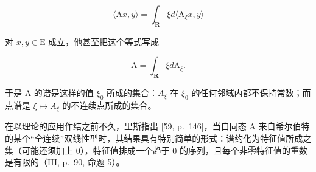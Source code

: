 \[
\langle \mathrm{A} x, y \rangle = \int_ {\mathbf {R}} \xi d \langle \mathrm{A} _ {\xi} x, y \rangle
\]

对 \(x, y \in \mathrm{E}\) 成立，他甚至把这个等式写成

\[
\mathrm{A} = \int_ {\mathbf {R}} \xi d \mathrm{A} _ {\xi}.
\]

于是 A 的谱是这样的值 \(\xi_{0}\) 所成的集合：\(A_{\xi}\) 在 \(\xi_{0}\) 的任何邻域内都不保持常数；而点谱是 \(\xi \mapsto A_{\xi}\) 的不连续点所成的集合。

在以理论的应用作结之前不久，里斯指出 [59, p.~146]，当自同态 A 来自希尔伯特的某个“全连续”双线性型时，其结果具有特别简单的形式：谱约化为特征值所成之集（可能还须加上 0），特征值排成一个趋于 0 的序列，且每个非零特征值的重数是有限的（III, p.~90, 命题 5）。

